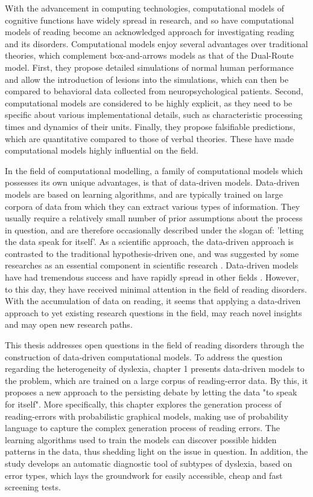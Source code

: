 With the advancement in computing technologies, computational models of cognitive functions have widely spread in research, and so have computational models of reading become an acknowledged approach for investigating  reading and its disorders. Computational models enjoy several advantages over traditional theories, which complement box-and-arrows models as that of the Dual-Route model. First, they propose detailed simulations of normal human performance and allow the introduction of lesions into the simulations, which can then be compared to behavioral data collected from neuropsychological patients. Second, computational models are considered to be highly explicit, as they need to be specific about various implementational details, such as characteristic processing times and dynamics of their units. Finally, they propose falsifiable predictions, which are quantitative compared to those of verbal theories. These have made computational models highly influential on the field.

In the field of computational modelling, a family of computational models which possesses its own unique advantages, is that of data-driven models. Data-driven models are based on learning algorithms, and are typically trained on large corpora of data from which they can extract various types of information. They usually require a relatively small number of prior assumptions about the process in question, and are therefore occasionally described under the slogan of: 'letting the data speak for itself'. As a scientific approach, the data-driven approach is contrasted to the traditional hypothesis-driven one, and was suggested by some researches as an essential component in scientific research \citep{kell2004here}. Data-driven models have had tremendous success and have rapidly spread in other fields \citep{bell2009beyond, leonelli2014difference, lecun2015deep}. However, to this day, they have received minimal attention in the field of reading disorders. With the accumulation of data on reading, it seems that applying a data-driven approach to yet existing research questions in the field, may reach novel insights and may open new research paths.

This thesis addresses open questions in the field of reading disorders through the construction of data-driven computational models. To address the question regarding the heterogeneity of dyslexia, chapter 1 presents data-driven models to the problem, which are trained on a large corpus of reading-error data. By this, it proposes a new approach to the persisting debate by letting the data "to speak for itself". More specifically, this chapter explores the generation process of reading-errors with probabilistic graphical models, making use of probability language to capture the complex generation process of reading errors. The learning algorithms used to train the models can discover possible hidden patterns in the data, thus shedding light on the issue in question. In addition, the study develops an automatic diagnostic tool of subtypes of dyslexia, based on error types, which lays the groundwork for easily accessible, cheap and fast screening tests. 

